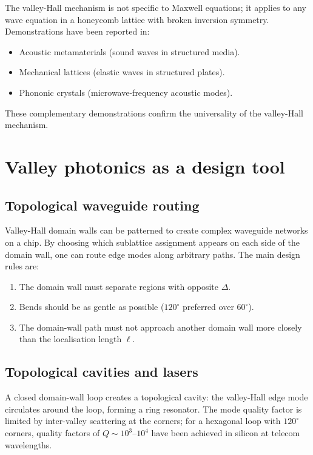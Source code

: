 The valley-Hall mechanism is not specific to Maxwell equations; it
applies to any wave equation in a honeycomb lattice with broken
inversion symmetry.  Demonstrations have been reported in:
\begin{itemize}
  \item Acoustic metamaterials (sound waves in structured media).
  \item Mechanical lattices (elastic waves in structured plates).
  \item Phononic crystals (microwave-frequency acoustic modes).
\end{itemize}
These complementary demonstrations confirm the universality of the
valley-Hall mechanism.

\section{Valley photonics as a design tool}
\label{sec:ch12-design-tool}

\subsection{Topological waveguide routing}
\label{sec:ch12-routing}

Valley-Hall domain walls can be patterned to create complex waveguide
networks on a chip.  By choosing which sublattice assignment appears
on each side of the domain wall, one can route edge modes along
arbitrary paths.  The main design rules are:
\begin{enumerate}
  \item The domain wall must separate regions with opposite $\Delta$.
  \item Bends should be as gentle as possible ($120^\circ$ preferred
  over $60^\circ$).
  \item The domain-wall path must not approach another domain wall
  more closely than the localisation length $\ell$.
\end{enumerate}

\subsection{Topological cavities and lasers}
\label{sec:ch12-cavities}

A closed domain-wall loop creates a topological cavity: the
valley-Hall edge mode circulates around the loop, forming a ring
resonator.  The mode quality factor is limited by inter-valley
scattering at the corners; for a hexagonal loop with
$120^\circ$ corners, quality factors of $Q\sim 10^3$--$10^4$ have
been achieved in silicon at telecom wavelengths.

